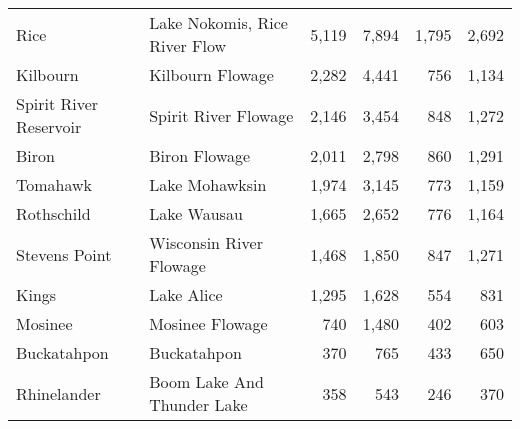 \begin{table}[h!]
\begin{tabular}{llrrrr}
		Rice                       & Lake Nokomis, Rice River Flow & 5,119                                & 7,894                                & 1,795                      & 2,692                      \\
		Kilbourn                   & Kilbourn Flowage              & 2,282                                & 4,441                                & 756                        & 1,134                      \\
		Spirit River Reservoir     & Spirit River Flowage          & 2,146                                & 3,454                                & 848                        & 1,272                      \\
		Biron                      & Biron Flowage                 & 2,011                                & 2,798                                & 860                        & 1,291                      \\
		Tomahawk                   & Lake Mohawksin                & 1,974                                & 3,145                                & 773                        & 1,159                      \\
		Rothschild                 & Lake Wausau                   & 1,665                                & 2,652                                & 776                        & 1,164                      \\
		Stevens Point              & Wisconsin River Flowage       & 1,468                                & 1,850                                & 847                        & 1,271                      \\
		Kings                      & Lake Alice                    & 1,295                                & 1,628                                & 554                        & 831                        \\
		Mosinee                    & Mosinee Flowage               & 740                                  & 1,480                                & 402                        & 603                        \\
		Buckatahpon                & Buckatahpon                   & 370                                  & 765                                  & 433                        & 650                        \\
		Rhinelander                & Boom Lake And Thunder Lake    & 358                                  & 543                                  & 246                        & 370                        \\

\end{tabular}
\end{table}
